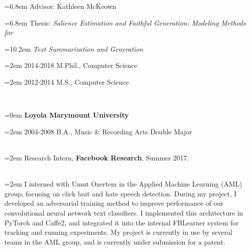 \documentclass{scrartcl}
\newcommand{\MarginSection}[1]{\marginpar{#1}}
\newcommand{\NewEntry}[2]{\noindent\hangindent=0em\hangafter=0 \parbox{4em}{\small #1} #2 
\vspace{0.35em}} %
\begin{document}
\begin{cv}{}
{\noindent\hangindent=6.8em Advisor: Kathleen McKeown

\noindent\hangindent=6.8em Thesis: \textit{Salience Estimation and Faithful Generation: Modeling Methods for}

\noindent\hangindent=10.2em \textit{Text Summarization and Generation}


\noindent\hangindent=2em 2014-2018 M.Phil., Computer Science 

\noindent\hangindent=2em 2012-2014 M.S., Computer Science 

}

{~\vspace{-1.25em}\\}

{\noindent\hangindent=0em \textbf{Loyola Marymount University} }

{\noindent\hangindent=2em 2004-2008 B.A., Music \& Recording Arts Double Major

}




    
~\\


\MarginSection{~\\Research\\Experience}\noindent\hangindent=2em Research Intern, \textbf{Facebook Research}, Summer 2017.\\

{~\vspace{-3.5em}\\}

\noindent\hangindent=2em I interned with Umut Ozertem in the 
Applied Machine Learning (AML) group, focusing on click bait and hate speech 
detection.
During my project, I developed an adversarial training method to improve 
performance of our convolutional neural network text classifiers.
I implemented this architecture in PyTorch and Caffe2, and integrated it into
the internal FBLearner system for tracking and running experiments.
My project is currently in use by several teams in the AML group, and is currently under submission for a patent.


\end{cv}
\end{document}
